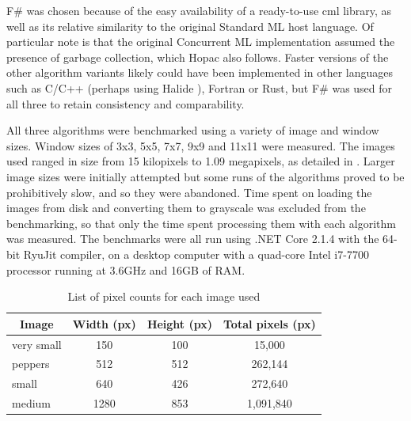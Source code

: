 F\# was chosen because of the easy availability of a ready-to-use \gls{cml} library, as well as its relative similarity to the original Standard ML host language.  Of particular note is that the original Concurrent ML implementation assumed the presence of garbage collection, which Hopac also follows.  Faster versions of the other algorithm variants likely could have been implemented in other languages such as C/C++ (perhaps using Halide \cite{Ragan-Kelley2017}), Fortran or Rust, but F\# was used for all three to retain consistency and comparability.  

All three algorithms were benchmarked using a variety of image and window sizes.  Window sizes of 3x3, 5x5, 7x7, 9x9 and 11x11 were measured.  The images used ranged in size from 15 kilopixels to 1.09 megapixels, as detailed in .  Larger image sizes were initially attempted but some runs of the algorithms proved to be prohibitively slow, and so they were abandoned.  Time spent on loading the images from disk and converting them to grayscale was excluded from the benchmarking, so that only the time spent processing them with each algorithm was measured.  The benchmarks were all run using .NET Core 2.1.4 with the 64-bit RyuJit compiler, on a desktop computer with a quad-core Intel i7-7700 processor running at 3.6GHz and 16GB of RAM.

\begin{table}
\centering
\caption{List of pixel counts for each image used}
\label{tab:median:pixelcounts}
\begin{tabular}{@{}lccc@{}}
\toprule
\multicolumn{1}{c}{\textbf{Image}} & \multicolumn{1}{c}{\textbf{Width (px)}} & \multicolumn{1}{c}{\textbf{Height (px)}} & \multicolumn{1}{c}{\textbf{Total pixels (px)}} \\ \midrule
very small                         & 150                                     & 100                                      & 15,000                                         \\
peppers                            & 512                                     & 512                                      & 262,144                                        \\
small                              & 640                                     & 426                                      & 272,640                                        \\
medium                             & 1280                                    & 853                                      & 1,091,840                                      \\ \bottomrule
\end{tabular}
\end{table}


